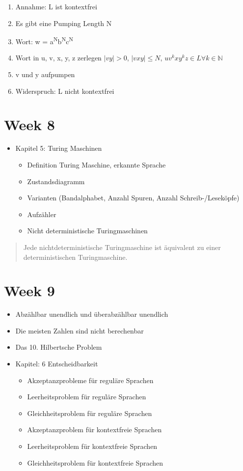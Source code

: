 \documentclass[11pt,twoside,landscape]{article}
\begin{document}
\begin{multicols}{3}
\begin{enumerate}
\item Annahme: L ist kontextfrei
\item Es gibt eine Pumping Length N
\item Wort: w = a\textsuperscript{N}b\textsuperscript{N}c\textsuperscript{N}
\item Wort in u, v, x, y, z zerlegen
\(|vy| > 0\), \(|vxy| \leq N\), \(uv^kxy^kz \in L \forall k \in \mathbb{N}\)
\item v und y aufpumpen
\item Widerspruch: L nicht kontextfrei
\end{enumerate}

\section*{Week 8}
\label{sec:org7d8d657}
\begin{itemize}
\item Kapitel 5: Turing Maschinen
\begin{itemize}
\item Definition Turing Maschine, erkannte Sprache
\item Zustandsdiagramm
\item Varianten (Bandalphabet, Anzahl Spuren, Anzahl Schreib-/Leseköpfe)
\item Aufzähler
\item Nicht deterministische Turingmaschinen
\end{itemize}
\end{itemize}

\begin{quote}
Jede nichtdeterministische Turingmaschine ist äquivalent zu einer deterministischen
Turingmaschine.
\end{quote}

\section*{Week 9}
\label{sec:org281d5fb}
\begin{itemize}
\item Abzählbar unendlich und überabzählbar unendlich
\item Die meisten Zahlen sind nicht berechenbar
\item Das 10. Hilbertsche Problem

\item Kapitel: 6 Entscheidbarkeit
\begin{itemize}
\item Akzeptanzprobleme für reguläre Sprachen
\item Leerheitsproblem für reguläre Sprachen
\item Gleichheitsproblem für reguläre Sprachen
\item Akzeptanzproblem für kontextfreie Sprachen
\item Leerheitsproblem für kontextfreie Sprachen
\item Gleichheitsproblem für kontextfreie Sprachen
\end{itemize}


\end{itemize}
\end{multicols}
\end{document}
